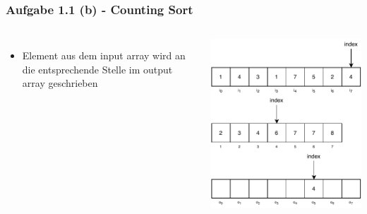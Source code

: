 \documentclass[aspectratio=169]{beamer}
\begin{document}
\begin{frame}
	\frametitle{Aufgabe 1.1 (b) - Counting Sort}
	\begin{columns}[c] %
	
	\begin{itemize}
		\item Element aus dem input array wird an die entsprechende Stelle im output array geschrieben
	\end{itemize}
	
	\includegraphics[scale=.7]{cs11.pdf}
	
	\end{columns}
	\end{frame}
\end{document}
